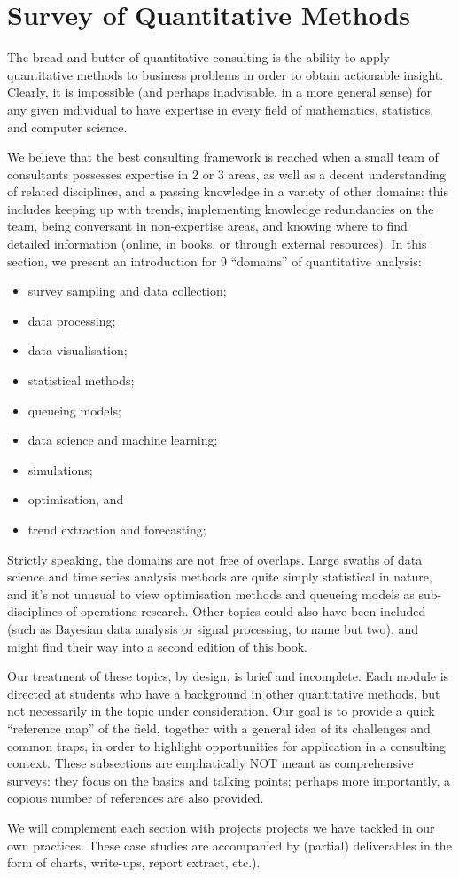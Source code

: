 \section{Survey of Quantitative Methods}
 The bread and butter of quantitative consulting is the ability to apply quantitative methods to business problems in order to obtain actionable insight. Clearly, it is impossible (and perhaps inadvisable, in a more general sense) for any given individual to have expertise in every field of mathematics, statistics, and computer science. \par We believe that the best consulting framework is reached when a small team of consultants possesses expertise in 2 or 3 areas, as well as a decent understanding of related disciplines, and a passing knowledge in a variety of other domains: this includes keeping up with trends, implementing knowledge redundancies on the team, being conversant in non-expertise areas, and knowing where to find detailed information (online, in books, or through external resources). \newl In this section, we present an introduction for 9 ``domains'' of quantitative analysis:
\begin{itemize}[noitemsep]
\item survey sampling and data collection;
\item data processing;
\item data visualisation;
\item statistical methods;
\item queueing models;
\item data science and machine learning;
\item simulations;
\item optimisation, and
\item trend extraction and forecasting;
\end{itemize}
Strictly speaking, the domains are not free of overlaps. Large swaths of data science and time series analysis methods are quite simply statistical in nature, and it's not unusual to view optimisation methods and queueing models as sub-disciplines of operations research. Other topics could also have been included (such as Bayesian data analysis or signal processing, to name but two), and might find their way into a second edition of this book. 
\par Our treatment of these topics, by design, is brief and incomplete. Each module is directed at students who have a background in other quantitative methods, but not necessarily in the topic under consideration. Our goal is to provide a quick ``reference map'' of the field, together with a general idea of its challenges and common traps, in order to highlight opportunities for application in a consulting context. These subsections are emphatically NOT meant as comprehensive surveys: they focus on the basics and talking points; perhaps more importantly, a copious number of references are also provided. \par We will complement each section with projects projects we have tackled in our own practices. These case studies are accompanied by (partial) deliverables in the form of charts, write-ups, report extract, etc.). 
